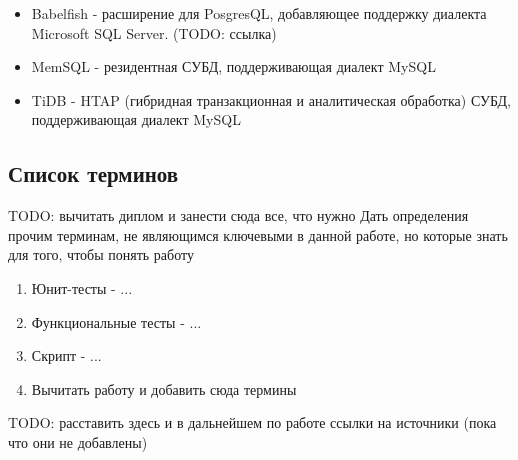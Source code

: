 \begin{itemize}
    \item Babelfish - расширение для PosgresQL, добавляющее поддержку диалекта Microsoft SQL Server. (TODO: ссылка)
    \item MemSQL - резидентная СУБД, поддерживающая диалект MySQL
    \item TiDB - HTAP (гибридная транзакционная и аналитическая обработка) СУБД, поддерживающая диалект MySQL
\end{itemize}

\subsection{Список терминов}
TODO: вычитать диплом и занести сюда все, что нужно
Дать определения прочим терминам, не являющимся ключевыми в данной работе, но которые знать для того, чтобы понять работу
\begin{enumerate}
    \item Юнит-тесты - ...
    \item Функциональные тесты - ...
    \item Скрипт - ...
    \item Вычитать работу и добавить сюда термины
\end{enumerate}

TODO: расставить здесь и в дальнейшем по работе ссылки на источники (пока что они не добавлены)

\pagebreak
